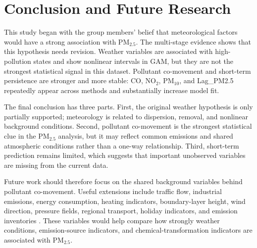 \documentclass[11pt]{article}
\begin{document}
\section{Conclusion and Future Research}

This study began with the group members' belief that meteorological factors would have a strong association with PM$_{2.5}$. The multi-stage evidence shows that this hypothesis needs revision. Weather variables are associated with high-pollution states and show nonlinear intervals in GAM, but they are not the strongest statistical signal in this dataset. Pollutant co-movement and short-term persistence are stronger and more stable: CO, NO$_2$, PM$_{10}$, and Lag\_PM2.5 repeatedly appear across methods and substantially increase model fit.

The final conclusion has three parts. First, the original weather hypothesis is only partially supported; meteorology is related to dispersion, removal, and nonlinear background conditions. Second, pollutant co-movement is the strongest statistical clue in the PM$_{2.5}$ analysis, but it may reflect common emissions and shared atmospheric conditions rather than a one-way relationship. Third, short-term prediction remains limited, which suggests that important unobserved variables are missing from the current data.

Future work should therefore focus on the shared background variables behind pollutant co-movement. Useful extensions include traffic flow, industrial emissions, energy consumption, heating indicators, boundary-layer height, wind direction, pressure fields, regional transport, holiday indicators, and emission inventories \cite{yu2013,lv2022}. These variables would help compare how strongly weather conditions, emission-source indicators, and chemical-transformation indicators are associated with PM$_{2.5}$.
\end{document}
